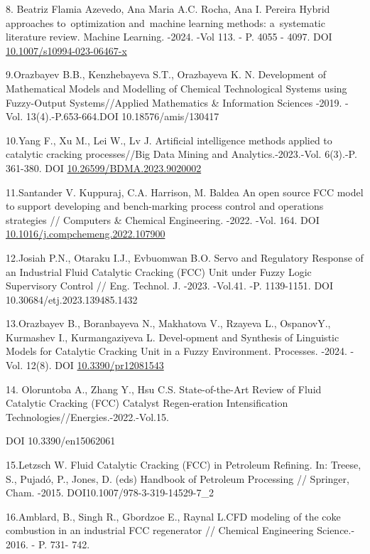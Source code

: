 \begin{references}
8. Beatriz Flamia Azevedo, Ana Maria A.C. Rocha, Ana I. Pereira Hybrid
approaches to~optimization and~machine learning methods: a~systematic
literature review. Machine Learning. -2024. -Vol 113. - P. 4055 -
4097. DOI \\\href{http://dx.doi.org/10.1007/s10994-023-06467-x}{10.1007/s10994-023-06467-x}

9.Orazbayev B.B., Kenzhebayeva S.T., Orazbayeva K. N. Development of
Mathematical Models and Modelling of Chemical Technological Systems
using Fuzzy-Output Systems//Applied Mathematics \& Information Sciences
-2019. -Vol. 13(4).-P.653-664.DOI 10.18576/amis/130417

10.Yang F., Xu M., Lei W., Lv J. Artificial intelligence methods applied
to catalytic cracking processes//Big Data Mining and
Analytics.-2023.-Vol. 6(3).-P. 361-380. DOI \href{http://dx.doi.org/10.26599/BDMA.2023.9020002}{10.26599/BDMA.2023.9020002}

11.Santander V. Kuppuraj, C.A. Harrison, M. Baldea An open source FCC
model to support developing and bench-marking process control and
operations strategies // Computers \& Chemical Engineering. -2022. -Vol.
164. DOI \\\href{https://doi.org/10.1016/j.compchemeng.2022.107900}{10.1016/j.compchemeng.2022.107900}

12.Josiah P.N., Otaraku I.J., Evbuomwan B.O. Servo and Regulatory
Response of an Industrial Fluid Catalytic Cracking (FCC) Unit under
Fuzzy Logic Supervisory Control // Eng. Technol. J. -2023. -Vol.41. -P.
1139-1151. DOI 10.30684/etj.2023.139485.1432

13.Orazbayev B., Boranbayeva N., Makhatova V., Rzayeva L., OspanovY.,
Kurmashev I., Kurmangaziyeva L. Devel-opment and Synthesis of Linguistic
Models for Catalytic Cracking Unit in a Fuzzy Environment. Processes.
-2024. -Vol. 12(8). DOI
\href{https://doi.org/10.3390/pr12081543}{10.3390/pr12081543}

14. Oloruntoba A., Zhang Y., Hsu C.S. State-of-the-Art Review of Fluid
Catalytic Cracking (FCC) Catalyst Regen-eration Intensification
Technologies//Energies.-2022.-Vol.15.

DOI 10.3390/en15062061

15.Letzsch W. Fluid Catalytic Cracking (FCC) in Petroleum Refining. In:
Treese, S., Pujadó, P., Jones, D. (eds) Handbook of Petroleum Processing
// Springer, Cham. -2015. DOI10.1007/978-3-319-14529-7\_2

16.Amblard, B., Singh R., Gbordzoe E., Raynal L.CFD modeling of the coke
combustion in an industrial FCC regenerator // Chemical Engineering
Science.- 2016. - P. 731- 742.


\end{references}
